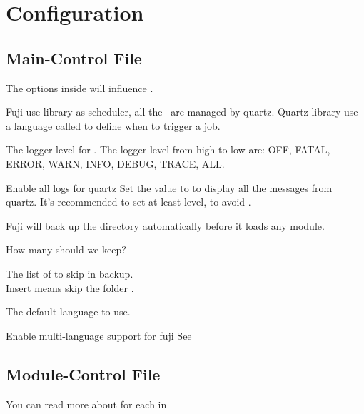 \chapter{Configuration}\label{ch:configuration}


\section{Main-Control File}

The  options inside  will influence .

Fuji use  library as scheduler, all the~ are managed by quartz.
Quartz library use a language called  to define when to trigger a job.

The logger level for .
The logger level from high to low are: OFF, FATAL, ERROR, WARN, INFO, DEBUG, TRACE, ALL.

\begin{example}{Enable all logs for quartz}
    Set the value to  to display all the messages from quartz.
    It's recommended to set at least  level, to avoid .
\end{example}

Fuji will back up the  directory automatically before it loads any module.

How many  should we keep?

The list of  to skip in backup. \\
Insert  means skip the folder .

The default language to use.

\begin{tips}{Enable multi-language support for fuji}
    See~
\end{tips}


\clearpage
\section{Module-Control File}
You can read more about  for each  in 